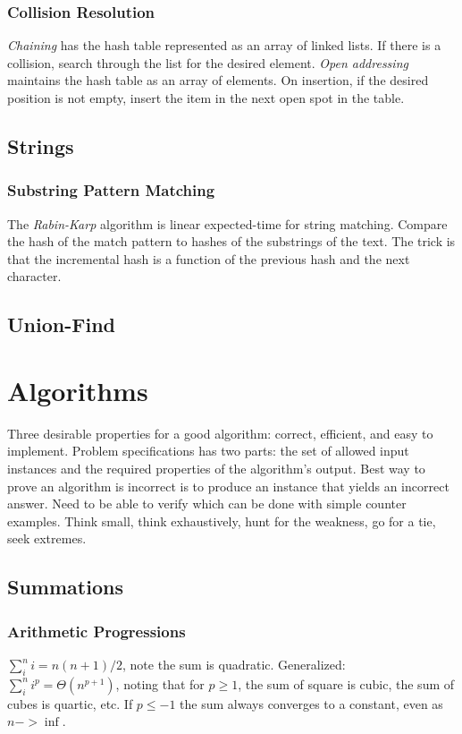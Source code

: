 \documentclass[10pt]{article}
\theoremstyle{definition}
\begin{document}
\subsubsection{Collision Resolution}
\textit{Chaining} has the hash table represented as an array of linked lists. If there is a collision, search through the list for the desired element. \textit{Open addressing} maintains the hash table as an array of elements. On insertion, if the desired position is not empty, insert the item in the next open spot in the table.
\subsection{Strings}
\subsubsection{Substring Pattern Matching}
The \textit{Rabin-Karp} algorithm is linear expected-time for string matching. Compare the hash of the match pattern to hashes of the substrings of the text. The trick is that the incremental hash is a function of the previous hash and the next character.

\subsection{Union-Find}

\section{Algorithms}
Three desirable properties for a good algorithm: correct, efficient, and easy to implement. Problem specifications has two parts: the set of allowed input instances and the required properties of the algorithm's output. Best way to prove an algorithm is incorrect is to produce an instance that yields an incorrect answer. Need to be able to verify which can be done with simple counter examples. Think small, think exhaustively, hunt for the weakness, go for a tie, seek extremes. 

\subsection{Summations}
\subsubsection{Arithmetic Progressions}
$\sum_i^n i = n(n+1)/2$, note the sum is quadratic. Generalized: $\sum_i^ni^p = \Theta(n^{p+1})$, noting that for $p\ge1$, the sum of square is cubic, the sum of cubes is quartic, etc. If $p\le-1$ the sum always converges to a constant, even as $n->\inf$.
\end{document}
